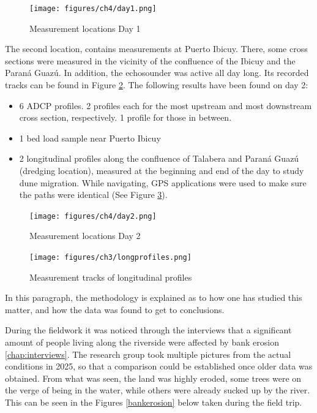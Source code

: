 \begin{figure}[H]
    \centering
    \texttt{[image: figures/ch4/day1.png]}
    \caption{Measurement locations Day 1}
    \label{fig:measurements day1}
\end{figure}

The second location, contains measurements at Puerto Ibicuy. There, some cross sections were measured in the vicinity of the confluence of the Ibicuy and the Paraná Guazú. In addition, the echosounder was active all day long. Its recorded tracks can be found in Figure \ref{fig:measurements day2}. The following results have been found on day 2:
\begin{itemize}
    \item 6 ADCP profiles. 2 profiles each for the most upstream and most downstream cross section, respectively. 1 profile for those in between. 
    \item 1 bed load sample near Puerto Ibicuy
    \item 2 longitudinal profiles along the confluence of Talabera and Paraná Guazú (dredging location), measured at the beginning and end of the day to study dune migration. While navigating, GPS applications were used to make sure the paths were identical (See Figure \ref{fig:longprofiles map}).
\end{itemize}

\begin{figure}[H]
    \centering
    \texttt{[image: figures/ch4/day2.png]}
    \caption{Measurement locations Day 2}
    \label{fig:measurements day2}
\end{figure}

\begin{figure}
    \centering
    \texttt{[image: figures/ch3/longprofiles.png]}
    \caption{Measurement tracks of longitudinal profiles}
    \label{fig:longprofiles map}
\end{figure}


In this paragraph, the methodology is explained as to how one has studied this matter, and how the data was found to get to conclusions.

During the fieldwork it was noticed through the interviews that a significant amount of people living along the riverside were affected by bank erosion \ref{chap:interviews}. The research group took multiple pictures from the actual conditions in 2025, so that a comparison could be established once older data was obtained. From what was seen, the land was highly eroded, some trees were on the verge of being in the water, while others were already sucked up by the river. This can be seen in the Figures \ref{bankerosion} below taken during the field trip.

